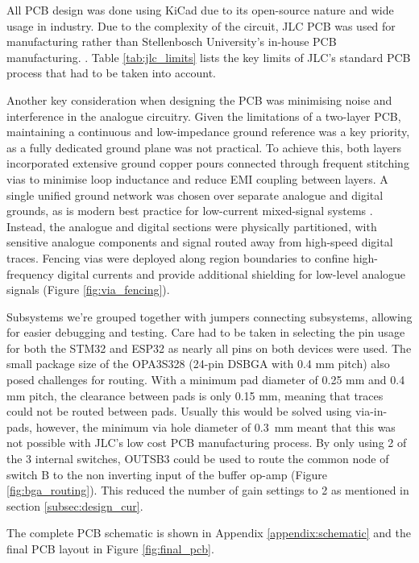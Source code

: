 All PCB design was done using KiCad due to its open-source nature and wide usage in industry. Due to the complexity of the circuit, JLC PCB was used for manufacturing rather than Stellenbosch University's in-house PCB manufacturing. . Table \ref{tab:jlc_limits} lists the key limits of JLC's standard PCB process that had to be taken into account. 

Another key consideration when designing the PCB was minimising noise and interference in the analogue circuitry. Given the limitations of a two-layer PCB, maintaining a continuous and low-impedance ground reference was a key priority, as a fully dedicated ground plane was not practical. To achieve this, both layers incorporated extensive ground copper pours connected through frequent stitching vias to minimise loop inductance and reduce \ac{EMI} coupling between layers. A single unified ground network was chosen over separate analogue and digital grounds, as is modern best practice for low-current mixed-signal systems \cite{WhatAreBasic}. Instead, the analogue and digital sections were physically partitioned, with sensitive analogue components and signal routed away from high-speed digital traces. Fencing vias were deployed along region boundaries to confine high-frequency digital currents and provide additional shielding for low-level analogue signals (Figure \ref{fig:via_fencing}).

Subsystems we're grouped together with jumpers connecting subsystems, allowing for easier debugging and testing. Care had to be taken in selecting the pin usage for both the STM32 and ESP32 as nearly all pins on both devices were used. The small package size of the OPA3S328 (24-pin DSBGA with 0.4 mm pitch) also posed challenges for routing. With a minimum pad diameter of 0.25 mm and 0.4 mm pitch, the clearance between pads is only 0.15 mm, meaning that traces could not be routed between pads. Usually this would be solved using via-in-pads, however, the minimum via hole diameter of 0.3 mm meant that this was not possible with JLC's low cost PCB manufacturing process. By only using 2 of the 3 internal switches, OUTSB3 could be used to route the common node of switch B to the non inverting input of the buffer op-amp (Figure \ref{fig:bga_routing}). This reduced the number of gain settings to 2 as mentioned in section \ref{subsec:design_cur}. 

The complete PCB schematic is shown in Appendix \ref{appendix:schematic} and the final PCB layout in Figure \ref{fig:final_pcb}.


